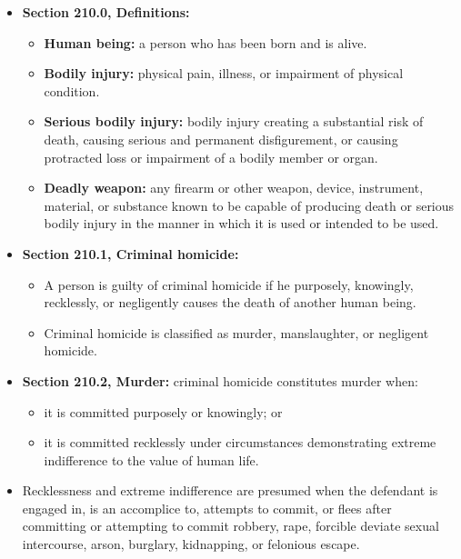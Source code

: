 \documentclass[11pt]{tex/lawoutline}
\begin{document}

{
\begin{itemize}
    \item \textbf{Section 210.0, Definitions:}
    \begin{itemize}
        \item \textbf{Human being:} a person who has been born and is alive.
        \item \textbf{Bodily injury:} physical pain, illness, or impairment of physical condition.
        \item \textbf{Serious bodily injury:} bodily injury creating a substantial risk of death, causing serious and permanent disfigurement, or causing protracted loss or impairment of a bodily member or organ.
        \item \textbf{Deadly weapon:} any firearm or other weapon, device, instrument, material, or substance known to be capable of producing death or serious bodily injury in the manner in which it is used or intended to be used.
    \end{itemize}

    \item \textbf{Section 210.1, Criminal homicide:}
    \begin{itemize}
        \item A person is guilty of criminal homicide if he purposely, knowingly, recklessly, or negligently causes the death of another human being.
        \item Criminal homicide is classified as murder, manslaughter, or negligent homicide.
    \end{itemize}

    \item \textbf{Section 210.2, Murder:} criminal homicide constitutes murder when:
    \begin{itemize}
        \item it is committed purposely or knowingly; or
        \item it is committed recklessly under circumstances demonstrating extreme indifference to the value of human life.
    \end{itemize}

    \item Recklessness and extreme indifference are presumed when the defendant is engaged in, is an accomplice to, attempts to commit, or flees after committing or attempting to commit robbery, rape, forcible deviate sexual intercourse, arson, burglary, kidnapping, or felonious escape.


\end{itemize}}
\end{document}
